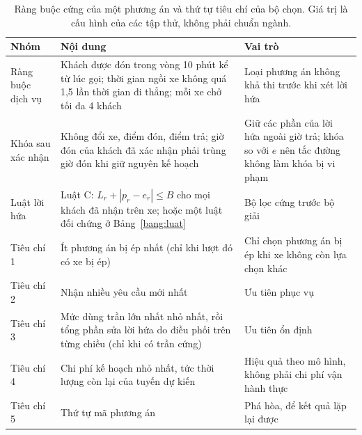 \begin{table}[htbp]
\centering
\caption{Ràng buộc cứng của một phương án và thứ tự tiêu chí của bộ chọn. Giá trị là cấu hình của các
tập thử, không phải chuẩn ngành.}
\label{bang:rangbuoc}
\small
\begin{tabular}{@{}p{2.7cm}p{7.2cm}p{4.9cm}@{}}
\toprule
\textbf{Nhóm} & \textbf{Nội dung} & \textbf{Vai trò}\\
\midrule
Ràng buộc dịch vụ & Khách được đón trong vòng 10 phút kể từ lúc gọi; thời gian ngồi xe không quá 1,5
lần thời gian đi thẳng; mỗi xe chở tối đa 4 khách & Loại phương án không khả thi trước khi xét lời
hứa\\
Khóa sau xác nhận & Không đổi xe, điểm đón, điểm trả; giờ đón của khách đã xác nhận phải trùng giờ đón
khi giữ nguyên kế hoạch & Giữ các phần của lời hứa ngoài giờ trả; khóa so với $e$ nên tắc đường không
làm khóa bị vi phạm\\
Luật lời hứa & Luật C: $L_r + |p_r - e_r| \le B$ cho mọi khách đã nhận trên xe; hoặc một luật đối
chứng ở Bảng~\ref{bang:luat} & Bộ lọc cứng trước bộ giải\\
\midrule
Tiêu chí 1 & Ít phương án bị ép nhất (chỉ khi lượt đó có xe bị ép) & Chỉ chọn phương án bị ép khi xe
không còn lựa chọn khác\\
Tiêu chí 2 & Nhận nhiều yêu cầu mới nhất & Ưu tiên phục vụ\\
Tiêu chí 3 & Mức dùng trần lớn nhất nhỏ nhất, rồi tổng phần sửa lời hứa do điều phối trên từng chiều
(chỉ khi có trần cứng) & Ưu tiên ổn định\\
Tiêu chí 4 & Chi phí kế hoạch nhỏ nhất, tức thời lượng còn lại của tuyến dự kiến & Hiệu quả theo mô
hình, không phải chi phí vận hành thực\\
Tiêu chí 5 & Thứ tự mã phương án & Phá hòa, để kết quả lặp lại được\\
\bottomrule
\end{tabular}
\end{table}

